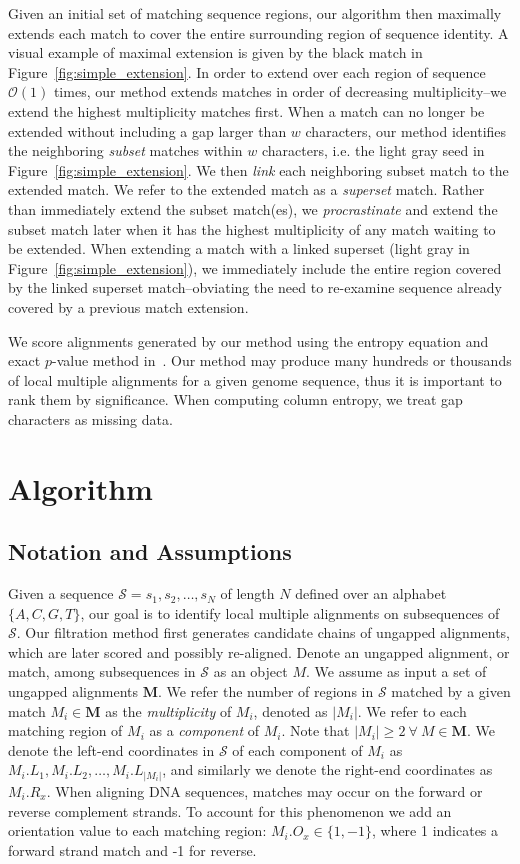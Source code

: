 \documentclass{llncs}
\begin{document}
Given an initial set of matching sequence regions, our algorithm
then maximally extends each match to cover the entire surrounding
region of sequence identity.  A visual example of maximal extension
is given by the black match in Figure~\ref{fig:simple_extension}. In
order to extend over each region of sequence $\mathcal{O}(1)$ times,
our method extends matches in order of decreasing multiplicity--we
extend the highest multiplicity matches first. When a match can no
longer be extended without including a gap larger than $w$
characters, our method identifies the neighboring \textit{subset}
matches within $w$ characters, i.e. the light gray seed in
Figure~\ref{fig:simple_extension}. We then \textit{link} each
neighboring subset match to the extended match. We refer to the
extended match as a \textit{superset} match. Rather than immediately
extend the subset match(es), we \textit{procrastinate} and extend
the subset match later when it has the highest multiplicity of any
match waiting to be extended. When extending a match with a linked
superset (light gray in Figure~\ref{fig:simple_extension}), we
immediately include the entire region covered by the linked superset
match--obviating the need to re-examine sequence already covered by
a previous match extension.

 We score alignments generated by our method using the
entropy equation and exact $p$-value method in~\cite{ref-keich05}.
Our method may produce many hundreds or thousands of local multiple
alignments for a given genome sequence, thus it is important to rank
them by significance.  When computing column entropy, we treat gap
characters as missing data.

\section{Algorithm}

\subsection{Notation and Assumptions}
Given a sequence $\mathcal{S}=s_1, s_2,\dots, s_N$ of length $N$
defined over an alphabet $\{A,C,G,T\}$, our goal is to identify
local multiple alignments on subsequences of $\mathcal{S}$. Our
filtration method first generates candidate chains of ungapped
alignments, which are later scored and possibly re-aligned.  Denote
an ungapped alignment, or match, among subsequences in $\mathcal{S}$
as an object $M$. We assume as input a set of ungapped alignments
$\mathbf{M}$.  We refer the number of regions in $\mathcal{S}$
matched by a given match $M_i \in \mathbf{M}$ as the
\textit{multiplicity} of $M_i$, denoted as $|M_i|$. We refer to each
matching region of $M_i$ as a \textit{component} of $M_i$. Note that
$|M_i| \geq 2~\forall~M \in \mathbf{M}$.  We denote the left-end
coordinates in $\mathcal{S}$ of each component of $M_i$ as $M_i.L_1,
M_i.L_2,\dots, M_i.L_{|M_i|}$, and similarly we denote the right-end
coordinates as $M_i.R_x$.  When aligning DNA sequences, matches may
occur on the forward or reverse complement strands. To account for
this phenomenon we add an orientation value to each matching region:
$M_i.O_x \in \{1,-1\}$, where 1 indicates a forward strand match and
-1 for reverse.
\end{document}
